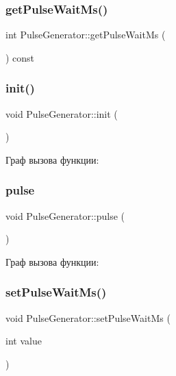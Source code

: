 \subsubsection{\texorpdfstring{get\+Pulse\+Wait\+Ms()}{getPulseWaitMs()}}
{\footnotesize\ttfamily int Pulse\+Generator\+::get\+Pulse\+Wait\+Ms (\begin{DoxyParamCaption}{ }\end{DoxyParamCaption}) const}

\mbox{\label{class_pulse_generator_a02a345a74696d6e1951ddff50c9208dc}} 
\subsubsection{\texorpdfstring{init()}{init()}}
{\footnotesize\ttfamily void Pulse\+Generator\+::init (\begin{DoxyParamCaption}{ }\end{DoxyParamCaption})}

Граф вызова функции\+:
\mbox{\label{class_pulse_generator_a9cba97e580401ccf955c6420670d8a57}} 
\subsubsection{\texorpdfstring{pulse}{pulse}}
{\footnotesize\ttfamily void Pulse\+Generator\+::pulse (\begin{DoxyParamCaption}{ }\end{DoxyParamCaption})\hspace{0.3cm}{\ttfamily [signal]}}

Граф вызова функции\+:
\mbox{\label{class_pulse_generator_a1ab5f10bb78d277d4e04a120f13908b6}} 
\subsubsection{\texorpdfstring{set\+Pulse\+Wait\+Ms()}{setPulseWaitMs()}}
{\footnotesize\ttfamily void Pulse\+Generator\+::set\+Pulse\+Wait\+Ms (\begin{DoxyParamCaption}\item[{int}]{value }\end{DoxyParamCaption})}

